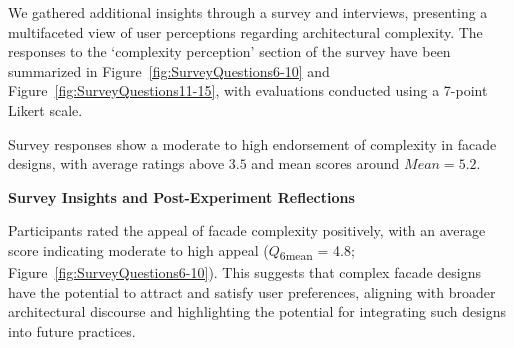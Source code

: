 %    


We gathered additional insights through a survey and interviews, presenting a multifaceted view of user perceptions regarding architectural complexity.
The responses to the `complexity perception' section of the survey have been summarized in Figure~\ref{fig:SurveyQuestions6-10} and Figure~\ref{fig:SurveyQuestions11-15}, with evaluations conducted using a 7-point Likert scale.

Survey responses show a moderate to high endorsement of complexity in facade designs, with average ratings above \(3.5\) and mean scores around \(Mean = 5.2\).

\textbf{Survey Insights and Post-Experiment Reflections}


Participants rated the appeal of facade complexity positively, with an average score indicating moderate to high appeal (\(Q\)\textsubscript{\small{6mean}} = 4.8; Figure~\ref{fig:SurveyQuestions6-10}).
This suggests that complex facade designs have the potential to attract and satisfy user preferences, aligning with broader architectural discourse and highlighting the potential for integrating such designs into future practices.

